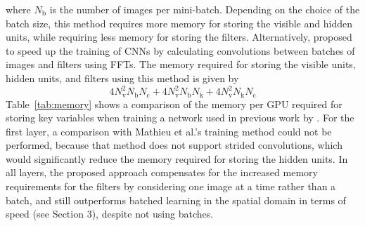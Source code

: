 where $N_\text{b}$ is the number of images per mini-batch. Depending on the
choice of the batch size, this method requires more memory for storing the
visible and hidden units, while requiring less memory for storing the filters.
Alternatively, \citet{Mathieu2013} proposed to speed up the training of CNNs by
calculating convolutions between batches of images and filters using FFTs. The
memory required for storing the visible units, hidden units, and filters using
this method is given by
\begin{equation}
4 N_\text{v}^2 N_\text{b}N_\text{c} + 4
N_\text{v}^2 N_\text{b}N_\text{k} + 4 N_\text{v}^2 N_\text{k}N_\text{c}
\end{equation}
Table~\ref{tab:memory} shows a comparison of the memory per GPU required for
storing key variables when training a network used in previous work by
\citet{Krizhevsky2012}. For the first layer, a comparison with Mathieu et al.'s
training method could not be performed, because that method does not support
strided convolutions, which would significantly reduce the memory required for
storing the hidden units. In all layers, the proposed approach compensates for
the increased memory requirements for the filters by considering one image at a
time rather than a batch, and still outperforms batched learning in the spatial
domain in terms of speed (see Section 3), despite not using batches.


